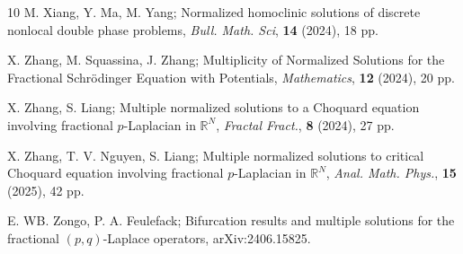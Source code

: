 \documentclass[reqno]{amsart}
\begin{document}
\begin{thebibliography}{10}
M. Xiang, Y. Ma, M. Yang;
Normalized homoclinic solutions of discrete nonlocal double phase problems,
\emph{Bull. Math. Sci}, \textbf{14} (2024), 18 pp.

X. Zhang, M. Squassina, J. Zhang;
Multiplicity of Normalized Solutions for the Fractional
Schr\"{o}dinger Equation with Potentials,
\emph{Mathematics}, \textbf{12} (2024), 20 pp.

X. Zhang, S. Liang;
Multiple normalized solutions to a Choquard equation
involving fractional $p$-Laplacian in $\mathbb{R}^N$,
\emph{Fractal Fract.}, \textbf{8} (2024), 27 pp.

X. Zhang, T. V. Nguyen,  S. Liang;
Multiple normalized solutions to critical Choquard equation involving fractional $p$-Laplacian in $\mathbb{R}^N$,
\emph{Anal. Math. Phys.}, \textbf{15} (2025), 42 pp.

E. WB. Zongo, P. A. Feulefack;
Bifurcation results and multiple solutions for the fractional 
$(p, q) $-Laplace operators,
{arXiv:2406.15825}.

\end{thebibliography}
\end{document}
